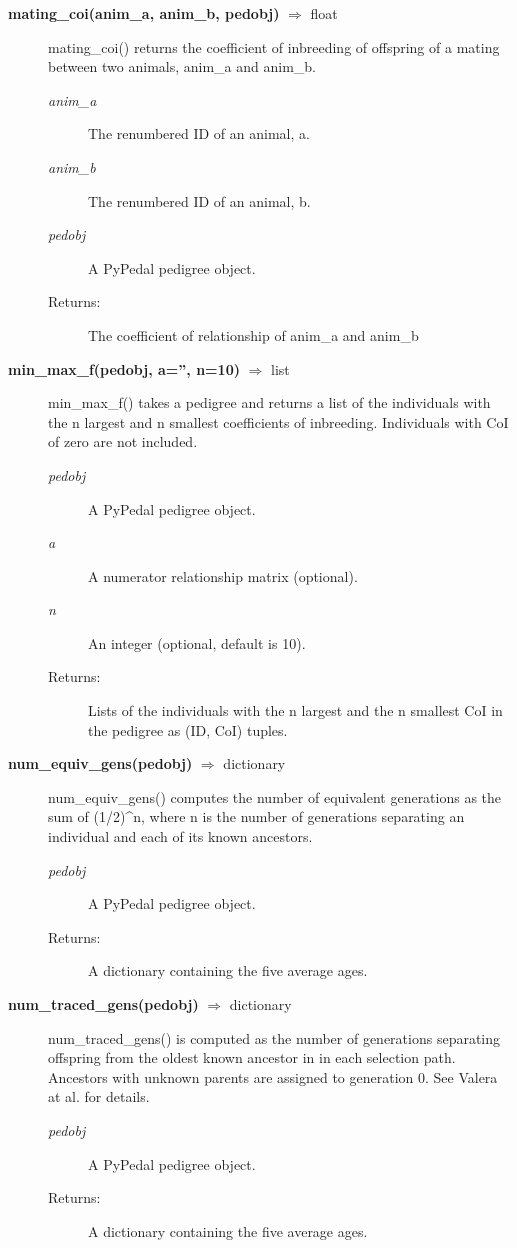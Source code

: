 \begin{description}
\item[\textbf{mating\_coi(anim\_a, anim\_b, pedobj)} $\Rightarrow$ float]
mating\_coi() returns the coefficient of inbreeding of offspring of a mating between two animals, anim\_a and anim\_b.
\begin{description}
\item[\emph{anim\_a}] The renumbered ID of an animal, a.
\item[\emph{anim\_b}] The renumbered ID of an animal, b.
\item[\emph{pedobj}] A PyPedal pedigree object.
\item[Returns:] The coefficient of relationship of anim\_a and anim\_b
\end{description}

\item[\textbf{min\_max\_f(pedobj, a='', n=10)} $\Rightarrow$ list]
min\_max\_f() takes a pedigree and returns a list of the individuals with the n largest and n smallest coefficients of inbreeding. Individuals with CoI of zero are not included.
\begin{description}
\item[\emph{pedobj}] A PyPedal pedigree object.
\item[\emph{a}] A numerator relationship matrix (optional).
\item[\emph{n}] An integer (optional, default is 10).
\item[Returns:] Lists of the individuals with the n largest and the n smallest CoI in the pedigree as (ID, CoI) tuples.
\end{description}

\item[\textbf{num\_equiv\_gens(pedobj)} $\Rightarrow$ dictionary]
num\_equiv\_gens() computes the number of equivalent generations as the sum of (1/2)\^{}n, where n is the number of generations separating an individual and each of its known ancestors.
\begin{description}
\item[\emph{pedobj}] A PyPedal pedigree object.
\item[Returns:] A dictionary containing the five average ages.
\end{description}

\item[\textbf{num\_traced\_gens(pedobj)} $\Rightarrow$ dictionary]
num\_traced\_gens() is computed as the number of generations separating offspring from the oldest known ancestor in in each selection path. Ancestors with unknown parents are assigned to generation 0. See Valera at al. \cite{Valera2005a} for details.
\begin{description}
\item[\emph{pedobj}] A PyPedal pedigree object.
\item[Returns:] A dictionary containing the five average ages.
\end{description}


\end{description}
